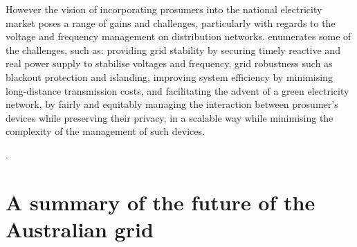 However the vision of incorporating prosumers into the national electricity market poses a range of gains and challenges, particularly with regards to the voltage and frequency management on distribution networks.
\cite{BELL2018765} enumerates some of the challenges, such as: providing grid stability by securing timely reactive and real power supply to stabilise voltages and frequency, grid robustness such as blackout protection and islanding, improving system efficiency by minimising long-distance transmission costs, and facilitating the advent of a green electricity network, by fairly and equitably managing the interaction between prosumer's devices while preserving their privacy, in a scalable way while minimising the complexity of the management of such devices.

\DIFdelbegin {}\DIFdelend %
\DIFaddbegin 

\DIFaddend .

\DIFaddbegin \noindent {}


\DIFaddend \section{A summary of the future of the Australian grid}\DIFaddbegin \label{sec:intro_summary}
\DIFaddend 




